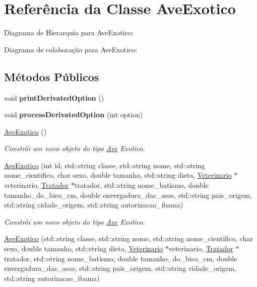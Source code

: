 \hypertarget{classAveExotico}{}\section{Referência da Classe Ave\+Exotico}
\label{classAveExotico}


Diagrama de Hierarquia para Ave\+Exotico\+:


Diagrama de colaboração para Ave\+Exotico\+:
\subsection*{Métodos Públicos}
\begin{DoxyCompactItemize}
\item 
\mbox{\label{classAveExotico_ac288f33c275533925f3647cff9448072}} 
void {\bfseries print\+Derivated\+Option} ()
\item 
\mbox{\label{classAveExotico_af90c7f126c3ae535f35c6c0d16d7ab5d}} 
void {\bfseries process\+Derivated\+Option} (int option)
\item 
\mbox{\label{classAveExotico_a60dd1f5a623f3b9215d7b3d6be44a525}} 
\hyperlink{classAveExotico_a60dd1f5a623f3b9215d7b3d6be44a525}{Ave\+Exotico} ()
\begin{DoxyCompactList}\small\item\em Constrói um novo objeto do tipo \hyperlink{classAve}{Ave} Exotico. \end{DoxyCompactList}\item 
\hyperlink{classAveExotico_a4bc404b26f0b3dc4025bc7c9ec5cedd3}{Ave\+Exotico} (int id, std\+::string classe, std\+::string nome, std\+::string nome\+\_\+cientifico, char sexo, double tamanho, std\+::string dieta, \hyperlink{classVeterinario}{Veterinario} $\ast$veterinario, \hyperlink{classTratador}{Tratador} $\ast$tratador, std\+::string nome\+\_\+batismo, double tamanho\+\_\+do\+\_\+bico\+\_\+cm, double envergadura\+\_\+das\+\_\+asas, std\+::string pais\+\_\+origem, std\+::string cidade\+\_\+origem, std\+::string autorizacao\+\_\+ibama)
\begin{DoxyCompactList}\small\item\em Constrói um novo objeto do tipo \hyperlink{classAve}{Ave} Exotico. \end{DoxyCompactList}\item 
\hyperlink{classAveExotico_afd7537696f757ff00283f78759b263b0}{Ave\+Exotico} (std\+::string classe, std\+::string nome, std\+::string nome\+\_\+cientifico, char sexo, double tamanho, std\+::string dieta, \hyperlink{classVeterinario}{Veterinario} $\ast$veterinario, \hyperlink{classTratador}{Tratador} $\ast$tratador, std\+::string nome\+\_\+batismo, double tamanho\+\_\+do\+\_\+bico\+\_\+cm, double envergadura\+\_\+das\+\_\+asas, std\+::string pais\+\_\+origem, std\+::string cidade\+\_\+origem, std\+::string autorizacao\+\_\+ibama)

\end{DoxyCompactItemize}
